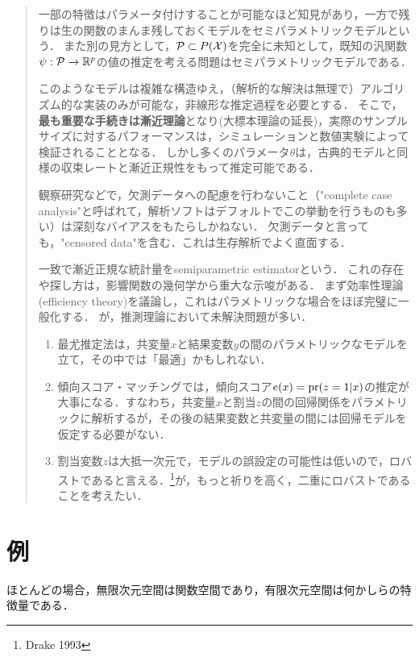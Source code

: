 \documentclass[uplatex,dvipdfmx]{jsreport}
\begin{document}
\begin{quotation}
    一部の特徴はパラメータ付けすることが可能なほど知見があり，一方で残りは生の関数のまんま残しておくモデルをセミパラメトリックモデルという．
    また別の見方として，$\mathcal{P}\subset P(\mathcal{X})$を完全に未知として，既知の汎関数$\psi:\mathcal{P}\to\mathbb{R}^p$の値の推定を考える問題はセミパラメトリックモデルである．

    このようなモデルは複雑な構造ゆえ，（解析的な解決は無理で）アルゴリズム的な実装のみが可能な，非線形な推定過程を必要とする．
    そこで，\textbf{最も重要な手続きは漸近理論}となり(大標本理論の延長)，実際のサンプルサイズに対するパフォーマンスは，シミュレーションと数値実験によって検証されることとなる．
    しかし多くのパラメータ$\theta$は，古典的モデルと同様の収束レートと漸近正規性をもって推定可能である．

    観察研究などで，欠測データへの配慮を行わないこと（"complete case analysis"と呼ばれて，解析ソフトはデフォルトでこの挙動を行うものも多い）は深刻なバイアスをもたらしかねない．
    欠測データと言っても，"censored data"を含む．これは生存解析でよく直面する．\cite{Tsiatis}

    一致で漸近正規な統計量をsemiparametric estimatorという．
    これの存在や探し方は，影響関数の幾何学から重大な示唆がある．
    まず効率性理論(efficiency theory)を議論し，これはパラメトリックな場合をほぼ完璧に一般化する．
    が，推測理論において未解決問題が多い．

    \begin{enumerate}
        \item 最尤推定法は，共変量$x$と結果変数$y$の間のパラメトリックなモデルを立て，その中では「最適」かもしれない．
        \item 傾向スコア・マッチングでは，傾向スコア$e(x)=\mathrm{pr}(z=1|x)$の推定が大事になる．すなわち，共変量$x$と割当$z$の間の回帰関係をパラメトリックに解析するが，その後の結果変数と共変量の間には回帰モデルを仮定する必要がない．
        \item 割当変数$z$は大抵一次元で，モデルの誤設定の可能性は低いので，ロバストであると言える．\footnote{Drake 1993}が，もっと祈りを高く，二重にロバストであることを考えたい．
    \end{enumerate}
\end{quotation}

\section{例}

\begin{tcolorbox}[colframe=ForestGreen, colback=ForestGreen!10!white,breakable,colbacktitle=ForestGreen!40!white,coltitle=black,fonttitle=\bfseries\sffamily,
title=]
    ほとんどの場合，無限次元空間は関数空間であり，有限次元空間は何かしらの特徴量である．
\end{tcolorbox}
\end{document}
